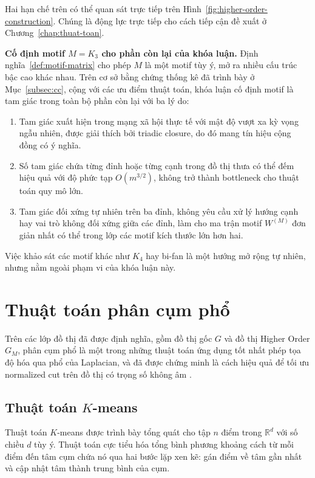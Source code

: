 Hai hạn chế trên có thể quan sát trực tiếp trên Hình~\ref{fig:higher-order-construction}. Chúng là động lực trực tiếp cho cách tiếp cận đề xuất ở Chương~\ref{chap:thuat-toan}.

\textbf{Cố định motif $M = K_3$ cho phần còn lại của khóa luận.} Định nghĩa~\ref{def:motif-matrix} cho phép $M$ là một motif tùy ý, mở ra nhiều cấu trúc bậc cao khác nhau. Trên cơ sở bằng chứng thống kê đã trình bày ở Mục~\ref{subsec:cc}, cộng với các ưu điểm thuật toán, khóa luận cố định motif là tam giác trong toàn bộ phần còn lại với ba lý do:
\leavevmode
\begin{enumerate}[topsep=4pt, itemsep=4pt, parsep=0pt]
    \item Tam giác xuất hiện trong mạng xã hội thực tế với mật độ vượt xa kỳ vọng ngẫu nhiên, được giải thích bởi triadic closure, do đó mang tín hiệu cộng đồng có ý nghĩa.
    \item Số tam giác chứa từng đỉnh hoặc từng cạnh trong đồ thị thưa có thể đếm hiệu quả với độ phức tạp $O(m^{3/2})$, không trở thành bottleneck cho thuật toán quy mô lớn.
    \item Tam giác đối xứng tự nhiên trên ba đỉnh, không yêu cầu xử lý hướng cạnh hay vai trò không đối xứng giữa các đỉnh, làm cho ma trận motif $W^{(M)}$ đơn giản nhất có thể trong lớp các motif kích thước lớn hơn hai.
\end{enumerate}
Việc khảo sát các motif khác như $K_4$ hay bi-fan là một hướng mở rộng tự nhiên, nhưng nằm ngoài phạm vi của khóa luận này.

\section{Thuật toán phân cụm phổ}
\label{sec:spectral-clustering}

Trên các lớp đồ thị đã được định nghĩa, gồm đồ thị gốc $G$ và đồ thị Higher Order $G_M$, phân cụm phổ là một trong những thuật toán ứng dụng tốt nhất phép tọa độ hóa qua phổ của Laplacian, và đã được chứng minh là cách hiệu quả để tối ưu normalized cut trên đồ thị có trọng số không âm \cite{shi2000}.

\subsection{Thuật toán $K$-means}
\label{subsec:kmeans}

Thuật toán $K$-means được trình bày tổng quát cho tập $n$ điểm trong $\mathbb{R}^d$ với số chiều $d$ tùy ý. Thuật toán cực tiểu hóa tổng bình phương khoảng cách từ mỗi điểm đến tâm cụm chứa nó qua hai bước lặp xen kẽ: gán điểm về tâm gần nhất và cập nhật tâm thành trung bình của cụm.

